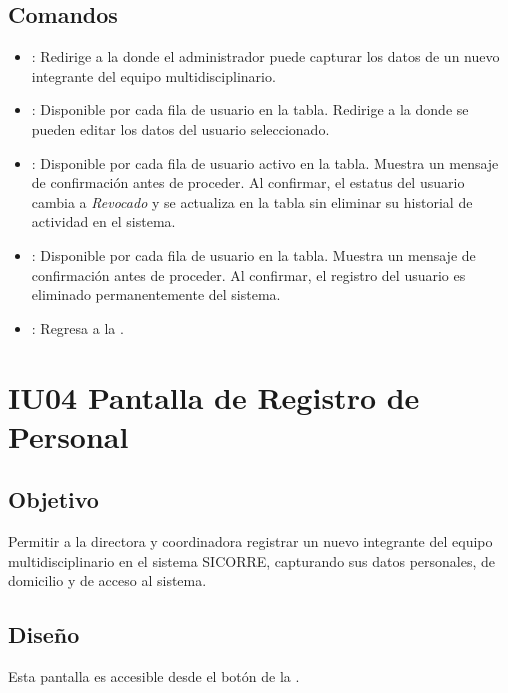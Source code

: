 \subsection{Comandos}
\begin{itemize}
	\item {}: Redirige a la 
	 donde el 
	administrador puede capturar los datos de un nuevo integrante 
	del equipo multidisciplinario.
	
	\item {}: Disponible por cada fila de usuario 
	en la tabla. Redirige a la 
	 donde se 
	pueden editar los datos del usuario seleccionado.
	
	\item {}: Disponible por cada fila de usuario 
	activo en la tabla. Muestra un mensaje de confirmación 
	 antes de 
	proceder. Al confirmar, el estatus del usuario cambia a 
	\textit{Revocado} y se actualiza en la tabla sin eliminar 
	su historial de actividad en el sistema.
	
	\item {}: Disponible por cada fila de usuario 
	en la tabla. Muestra un mensaje de confirmación 
	 antes de 
	proceder. Al confirmar, el registro del usuario es eliminado 
	permanentemente del sistema.
	
	\item {}: Regresa a la 
	.
\end{itemize}


\section{IU04 Pantalla de Registro de Personal}

\subsection{Objetivo}
Permitir a la directora y coordinadora registrar un nuevo integrante 
del equipo multidisciplinario en el sistema SICORRE, capturando sus 
datos personales, de domicilio y de acceso al sistema.

\subsection{Diseño}
Esta pantalla  es 
accesible desde el botón  de la 
.

